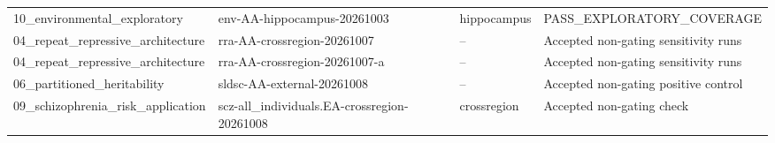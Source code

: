 \begin{tabular}{llll}
10\_environmental\_exploratory & env-AA-hippocampus-20261003 & hippocampus & PASS\_EXPLORATORY\_COVERAGE \\
04\_repeat\_repressive\_architecture & rra-AA-crossregion-20261007 & -- & Accepted non-gating sensitivity runs \\
04\_repeat\_repressive\_architecture & rra-AA-crossregion-20261007-a & -- & Accepted non-gating sensitivity runs \\
06\_partitioned\_heritability & sldsc-AA-external-20261008 & -- & Accepted non-gating positive control \\
09\_schizophrenia\_risk\_application & scz-all\_individuals.EA-crossregion-20261008 & crossregion & Accepted non-gating check \\
\bottomrule
\end{tabular}

